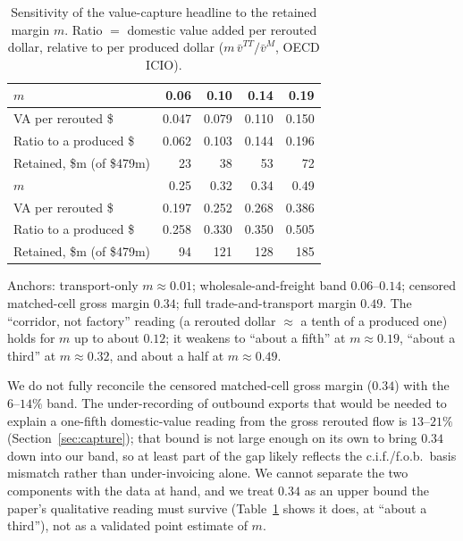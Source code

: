 \documentclass[12pt]{article}
\begin{document}
\begin{table}[htbp]
\centering
\caption{Sensitivity of the value-capture headline to the retained margin $m$.
Ratio $=$ domestic value added per rerouted dollar, relative to per produced dollar
($m\,\bar v^{TT}/\bar v^{M}$, OECD ICIO).}
\label{tab:appd}
\footnotesize
\begin{tabular}{@{}lrrrr@{}}
\toprule
$m$ & 0.06 & 0.10 & 0.14 & 0.19 \\
\midrule
VA per rerouted \$ & 0.047 & 0.079 & 0.110 & 0.150 \\
Ratio to a produced \$ & 0.062 & 0.103 & 0.144 & 0.196 \\
Retained, \$m (of \$479m) & 23 & 38 & 53 & 72 \\
\midrule
$m$ & 0.25 & 0.32 & 0.34 & 0.49 \\
\midrule
VA per rerouted \$ & 0.197 & 0.252 & 0.268 & 0.386 \\
Ratio to a produced \$ & 0.258 & 0.330 & 0.350 & 0.505 \\
Retained, \$m (of \$479m) & 94 & 121 & 128 & 185 \\
\bottomrule
\end{tabular}

\vspace{2pt}
\footnotesize Anchors: transport-only $m\approx 0.01$; wholesale-and-freight band
$0.06$--$0.14$; censored matched-cell gross margin $0.34$; full trade-and-transport margin
$0.49$. The ``corridor, not factory'' reading (a rerouted dollar $\approx$ a tenth of a
produced one) holds for $m$ up to about $0.12$; it weakens to ``about a fifth'' at $m\approx
0.19$, ``about a third'' at $m\approx 0.32$, and about a half at $m\approx 0.49$.
\end{table}

We do not fully reconcile the censored matched-cell gross margin ($0.34$) with the $6$--$14\%$
band. The under-recording of outbound exports that would be needed to explain a one-fifth
domestic-value reading from the gross rerouted flow is $13$--$21\%$ (Section~\ref{sec:capture});
that bound is not large enough on its own to bring $0.34$ down into our band, so at least part
of the gap likely reflects the c.i.f./f.o.b.\ basis mismatch rather than under-invoicing alone.
We cannot separate the two components with the data at hand, and we treat $0.34$ as an upper
bound the paper's qualitative reading must survive (Table~\ref{tab:appd} shows it does, at
``about a third''), not as a validated point estimate of $m$.
\end{document}
